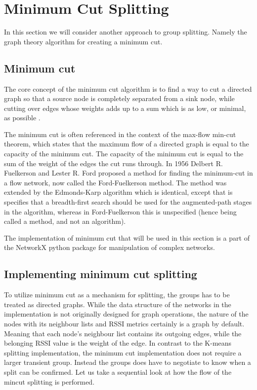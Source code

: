 \section{Minimum Cut Splitting}
In this section we will consider another approach to group splitting. Namely the graph theory algorithm for creating a minimum cut.

\subsection{Minimum cut}
The core concept of the minimum cut algorithm is to find a way to cut a directed graph so that a source node is completely separated from a sink node, while cutting over edges 
whose weights adds up to a sum which is as low, or minimal, as possible \cite{chinneck}.

The minimum cut is often referenced in the context of the max-flow min-cut theorem, which states that the maximum flow of a directed graph is equal to the capacity of the minimum cut.
The capacity of the minimum cut is equal to the sum of the weight of the edges the cut runs through. In 1956 Delbert R. Fuelkerson and Lester R.
Ford proposed a method for finding the minimum-cut \cite{ford1956} in a flow network, now called the Ford-Fuelkerson method. The method was extended by the Edmonds-Karp algorithm \cite{Edmonds} which is identical, except that is specifies that a breadth-first search should be used for the augmented-path stages in the algorithm, whereas in Ford-Fuelkerson this is unspecified (hence being called
a method, and not an algorithm).

The implementation of minimum cut that will be used in this section is a part of the NetworkX \cite{NetworkX} python package for manipulation of complex networks.

\subsection{Implementing minimum cut splitting}
To utilize minimum cut as a mechanism for splitting, the groups has to be treated as directed graphs. While the data structure of the networks in the implementation is not
originally designed for graph operations, the nature of the nodes with its neighbour lists and RSSI metrics certainly is a graph by default. Meaning that each node's neighbour list contains
its outgoing edges, while the belonging RSSI value is the weight of the edge. In contrast to the K-means splitting implementation, the minimum cut implementation does not require
a larger transient group. Instead the groups does have to negotiate to know when a split can be confirmed. Let us take a sequential look at how the flow of the mincut splitting is performed. 

